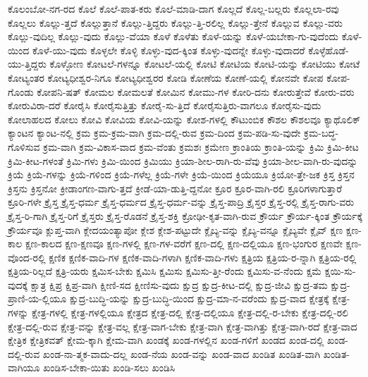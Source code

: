 {ಕೊಲಂಬೋ-ನಗ-ರದ
ಕೊಲೆ
ಕೊಲೆ-ಪಾತ-ಕರು
ಕೊಲೆ-ಮಾಡಿ-ದಾಗ
ಕೊಲ್ಲದೆ
ಕೊಲ್ಲ-ಬಲ್ಲರು
ಕೊಲ್ಲಲಾ-ರವು
ಕೊಲ್ಲಲು
ಕೊಲ್ಲು-ತ್ತದೆ
ಕೊಲ್ಲುತ್ತಾನೆ
ಕೊಲ್ಲು-ತ್ತಿದ್ದರು
ಕೊಲ್ಲು-ತ್ತಿ-ರಲಿಲ್ಲ
ಕೊಲ್ಲು-ತ್ತೇನೆ
ಕೊಲ್ಲುವ
ಕೊಲ್ಲು-ವರು
ಕೊಲ್ಲು-ವುದಿಲ್ಲ
ಕೊಲ್ಲು-ವುದು
ಕೊಲ್ಲು-ವೆಯಾ
ಕೊಳೆ
ಕೊಳೆತು
ಕೊಳೆ-ಯನ್ನು
ಕೊಳೆ-ಯಬೇಕಾ-ಗು-ವುದೆಂದು
ಕೊಳೆ-ಯಿಂದ
ಕೊಳೆ-ಯು-ವುದು
ಕೊಳ್ಳಲೇ
ಕೊಳ್ಳಿ
ಕೊಳ್ಳು-ವುದ-ಕ್ಕಿಂತ
ಕೊಳ್ಳು-ವುದನ್ನೇ
ಕೊಳ್ಳು-ವುದಾದರೆ
ಕೊಳ್ಳೆಹೊಡೆ-ಯು-ತ್ತಿದ್ದರು
ಕೊಳ್ಳೋಣ
ಕೋಟಲೆ-ಗಳನ್ನೂ
ಕೋಟಲೆ-ಯಲ್ಲಿ
ಕೋಟಿ
ಕೋಟಿಯ
ಕೋಟಿ-ಯನ್ನು
ಕೋಟಿಯು
ಕೋಟೆ
ಕೋಟ್ಯಂತರ
ಕೋಟ್ಯಧೀಶ್ವರ-ನಿಗೂ
ಕೋಟ್ಯಧೀಶ್ವರರ
ಕೋಡಿ
ಕೋಣೆಯ
ಕೋಣೆ-ಯಲ್ಲಿ
ಕೋನವೇ
ಕೋಪ
ಕೋಪ-ಗೊಂಡು
ಕೋಪನಿ-ಷತ್
ಕೋಮಲ
ಕೋಮಲತೆ
ಕೋಮಿನ
ಕೋಮು-ಗಳ
ಕೋರಿ-ದನು
ಕೋರುತ್ತೇವೆ
ಕೋರು-ವರು
ಕೋರುವಿರಾ-ದರೆ
ಕೋರೈಸಿ
ಕೋರೈಸುತ್ತಿತ್ತು
ಕೋರೈ-ಸು-ತ್ತಿದೆ
ಕೋರೈಸುತ್ತಿರು-ವಾಗಲೂ
ಕೋರೈಸು-ವುದು
ಕೋಲಾಹಲದ
ಕೋಲು
ಕೋವಿ
ಕೋವಿಯ
ಕೋವಿ-ಯನ್ನು
ಕೋಶ-ಗಳಲ್ಲಿ
ಕೌಟುಂಬಿಕ
ಕೌಶಲ
ಕೌಶಲವೂ
ಕ್ಯಾಥೊಲಿಕ್
ಕ್ಯಾಂಟನ
ಕ್ಯಾಂಟ-ನಲ್ಲಿ
ಕ್ರಮ
ಕ್ರಮ-ಕ್ರಮ-ವಾಗಿ
ಕ್ರಮ-ದಲ್ಲಿ-ರುವ
ಕ್ರಮ-ದಿಂದ
ಕ್ರಮ-ಪಡಿ-ಸು-ವುದೇ
ಕ್ರಮ-ಬದ್ಧ-ಗೊಳಿಸುವ
ಕ್ರಮ-ವಾಗಿ
ಕ್ರಮ-ವಿಕಾಸ-ವಾದ
ಕ್ರಮ-ವೆಂತು
ಕ್ರಮಶಃ
ಕ್ರಮೇಣ
ಕ್ರಾಂತಿಯ
ಕ್ರಾಂತಿ-ಯನ್ನು
ಕ್ರಿಮಿ
ಕ್ರಿಮಿ-ಕೀಟ
ಕ್ರಿಮಿ-ಕೀಟ-ಗಳಂತೆ
ಕ್ರಿಮಿ-ಗಳು
ಕ್ರಿಮಿ-ಯಿಂದ
ಕ್ರಿಮಿಯು
ಕ್ರಿಯಾ-ಶೀಲ-ರಾಗಿ-ರು-ವೆವು
ಕ್ರಿಯಾ-ಶೀಲ-ವಾಗಿ-ರು-ವುದನ್ನು
ಕ್ರಿಯೆ
ಕ್ರಿಯೆ-ಗಳನ್ನು
ಕ್ರಿಯೆ-ಗಳಿಂದ
ಕ್ರಿಯೆ-ಗಳೆಲ್ಲ
ಕ್ರಿಯೆ-ಗಳೇ
ಕ್ರಿಯೆ-ಯಿಂದ
ಕ್ರಿಯೆಯೂ
ಕ್ರಿಯೋ-ತ್ತೇ-ಜಕ
ಕ್ರಿಸ್ತ
ಕ್ರಿಸ್ತನ
ಕ್ರಿಸ್ತನು
ಕ್ರಿಸ್ತನೋ
ಕ್ರೀಡಾಂಗಣ-ವಾಗು-ತ್ತದೆ
ಕ್ರೀಡೆ-ಯಾ-ಡುತ್ತಿ-ದ್ದನೋ
ಕ್ರೂರ
ಕ್ರೂರ-ವಾಗಿ-ರಲಿ
ಕ್ರೂರಿಗಳಾಗುತ್ತಾರೆ
ಕ್ರೂರಿ-ಗಳೇ
ಕ್ರೈಸ್ತ
ಕ್ರೈಸ್ತ-ಧರ್ಮ
ಕ್ರೈಸ್ತ-ಧರ್ಮದ
ಕ್ರೈಸ್ತ-ಧರ್ಮ-ವನ್ನು
ಕ್ರೈಸ್ತ-ಪಾದ್ರಿ
ಕ್ರೈಸ್ತರ
ಕ್ರೈಸ್ತ-ರಲ್ಲಿ
ಕ್ರೈಸ್ತ-ರಾಗು-ವರು
ಕ್ರೈಸ್ತ-ರಿ-ಗಾಗಿ
ಕ್ರೈಸ್ತ-ರಿಗೆ
ಕ್ರೈಸ್ತರು
ಕ್ರೈಸ್ತ-ರೊಡನೆ
ಕ್ರೈಸ್ತ-ಶಕ್ತಿ
ಕ್ರೋಢೀ-ಕೃತ-ವಾಗಿ-ರುವ
ಕ್ರೌರ್ಯ
ಕ್ರೌರ್ಯ-ಕ್ಕಿಂತ
ಕ್ರೌರ್ಯಕ್ಕೆ
ಕ್ರೌರ್ಯವೂ
ಕ್ಲುಪ್ತ-ವಾಗಿ
ಕ್ಲೇದಯಂತ್ಯಾಪೋ
ಕ್ಲೇಶ
ಕ್ಲೇಶ-ಪಟ್ಟುದೇ
ಕ್ಲೈಬ್ಯ-ವನ್ನು
ಕ್ಲೈಬ್ಯ-ವನ್ನೂ
ಕ್ಲೈಬ್ಯವೇ
ಕ್ಲೈವ್
ಕ್ಷಣ
ಕ್ಷಣ-ಕಾಲ
ಕ್ಷಣ-ಕಾಲದ
ಕ್ಷಣ-ಕ್ಷಣವೂ
ಕ್ಷಣ-ಗಳಲ್ಲಿ
ಕ್ಷಣ-ಗಳ-ವರೆಗೆ
ಕ್ಷಣ-ದಲ್ಲಿ
ಕ್ಷಣ-ದಲ್ಲಿಯೂ
ಕ್ಷಣ-ಭಂಗುರ
ಕ್ಷಣವೇ
ಕ್ಷಣ-ವೊಂದ-ರಲ್ಲಿ
ಕ್ಷಣಿಕ
ಕ್ಷಣಿಕ-ವಾದಿ-ಗಳ
ಕ್ಷಣಿಕ-ವಾದಿ-ಗಳಾಗಿ
ಕ್ಷಣಿಕ-ವಾದಿ-ಗಳು
ಕ್ಷತ್ರಿಯ
ಕ್ಷತ್ರಿಯ-ರ-ನ್ನಾಗಿ
ಕ್ಷತ್ರಿಯ-ರಲ್ಲಿ
ಕ್ಷತ್ರಿಯ-ರಿಲ್ಲದೆ
ಕ್ಷತ್ರಿ-ಯರು
ಕ್ಷಮಿಸ-ಬೇಕು
ಕ್ಷಮಿಸಿ
ಕ್ಷಮಿಸು
ಕ್ಷಮಿಸು-ತ್ತೀ-ರೆಂದು
ಕ್ಷಮಿಸು-ವ-ನೆಂದು
ಕ್ಷಮೆ
ಕ್ಷಯಿ-ಸು-ವುದಕ್ಕೆ
ಕ್ಷಾತ್ರ
ಕ್ಷಿಪ್ರ
ಕ್ಷಿಪ್ರ-ವಾಗಿ
ಕ್ಷೀಣಿ-ಸದ
ಕ್ಷೀಣಿಸು-ವುದು
ಕ್ಷುದ್ರ
ಕ್ಷುದ್ರ-ಕೀಟ-ದಲ್ಲಿ
ಕ್ಷುದ್ರ-ಜೀವಿ
ಕ್ಷುದ್ರ-ತಮ
ಕ್ಷುದ್ರ-ಪ್ರಾಣಿ-ಯ-ಲ್ಲಿಯೂ
ಕ್ಷುದ್ರ-ಬುದ್ಧಿ-ಯನ್ನು
ಕ್ಷುದ್ರ-ಬುದ್ಧಿ-ಯಿಂದ
ಕ್ಷುದ್ರ-ಮಾ-ನ-ವರೆಂದು
ಕ್ಷುದ್ರ-ವಾದ
ಕ್ಷೇತ್ರಕ್ಕೆ
ಕ್ಷೇತ್ರ-ಗಳನ್ನು
ಕ್ಷೇತ್ರ-ಗಳಲ್ಲಿ
ಕ್ಷೇತ್ರ-ಗಳಲ್ಲಿಯೂ
ಕ್ಷೇತ್ರದ
ಕ್ಷೇತ್ರ-ದಲ್ಲಿ
ಕ್ಷೇತ್ರ-ದಲ್ಲಿಯೂ
ಕ್ಷೇತ್ರ-ದಲ್ಲಿ-ರ-ಬೇಕು
ಕ್ಷೇತ್ರ-ದಲ್ಲಿ-ರಲಿ
ಕ್ಷೇತ್ರ-ದಲ್ಲಿ-ರುವ
ಕ್ಷೇತ್ರ-ವನ್ನು
ಕ್ಷೇತ್ರ-ವಲ್ಲ
ಕ್ಷೇತ್ರ-ವಾಗ-ಬೇಕು
ಕ್ಷೇತ್ರ-ವಾಗಿ
ಕ್ಷೇತ್ರ-ವಾಗಿತ್ತು
ಕ್ಷೇತ್ರ-ವಾಗಿ-ರದೆ
ಕ್ಷೇತ್ರ-ವಾದ
ಕ್ಷೇತ್ರಿಕ
ಕ್ಷೇತ್ರಿಕವತ್
ಕ್ಷೇಮ-ಕ್ಕಾಗಿ
ಕ್ಷೇಮ-ವಾಗಿ
ಖಂಡಕ್ಕೆ
ಖಂಡ-ಗಳಲ್ಲಿನ
ಖಂಡ-ಗಳಿಗೆ
ಖಂಡದ
ಖಂಡ-ದಲ್ಲಿ
ಖಂಡ-ದಲ್ಲಿ-ರುವ
ಖಂಡ-ನಾ-ತ್ಮಕ-ವಾದು-ದಲ್ಲ
ಖಂಡ-ನೆಯ
ಖಂಡ-ವನ್ನು
ಖಂಡ-ವಾದ
ಖಂಡಿತ
ಖಂಡಿತ-ವಾಗಿ
ಖಂಡಿತ-ವಾಗಿಯೂ
ಖಂಡಿಸ-ಬೇಕಾ-ಯಿತು
ಖಂಡಿ-ಸಲು
ಖಂಡಿಸಿ
}
